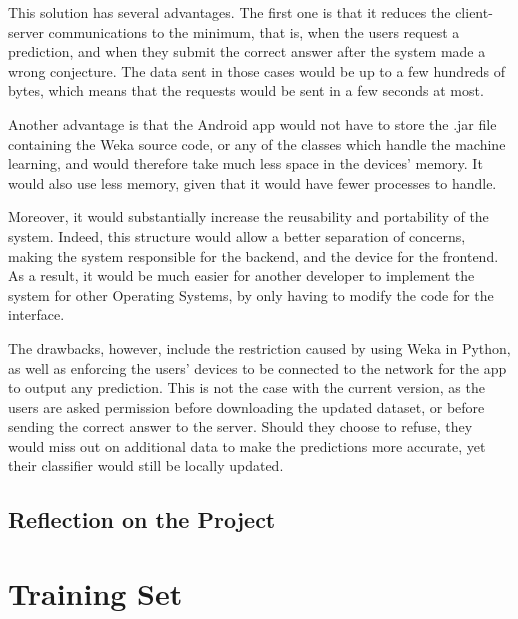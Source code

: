 \documentclass{mproj}
\begin{document}
This solution has several advantages. The first one is that it reduces the client-server communications to the minimum, that is, when the users request a prediction, and when they submit the correct answer after the system made a wrong conjecture. The data sent in those cases would be up to a few hundreds of bytes, which means that the requests would be sent in a few seconds at most. \par

Another advantage is that the Android app would not have to store the .jar file containing the Weka source code, or any of the classes which handle the machine learning, and would therefore take much less space in the devices' memory. It would also use less memory, given that it would have fewer processes to handle. \par

Moreover, it would substantially increase the reusability and portability of the system. Indeed, this structure would allow a better separation of concerns, making the system responsible for the backend, and the device for the frontend. As a result, it would be much easier for another developer to implement the system for other Operating Systems, by only having to modify the code for the interface. \par

The drawbacks, however, include the restriction caused by using Weka in Python, as well as enforcing the users' devices to be connected to the network for the app to output any prediction. This is not the case with the current version, as the users are asked permission before downloading the updated dataset, or before sending the correct answer to the server. Should they choose to refuse, they would miss out on additional data to make the predictions more accurate, yet their classifier would still be locally updated.

\section{Reflection on the Project}





\appendix


\chapter{Training Set}\label{dataset}
\end{document}
